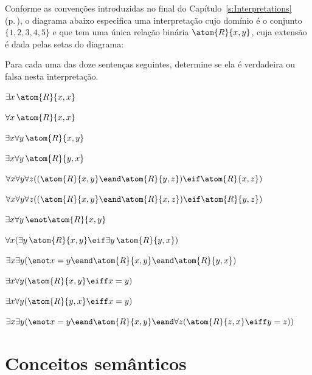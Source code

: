 \problempart
\label{pr.TorF3}
Conforme as convenções introduzidas no final do Capítulo~\ref{s:Interpretations} (p.\,\pageref{s:Interpret}), o diagrama abaixo especifica uma interpretação cujo domínio é o conjunto $\{1,2,3,4,5\}$ e que tem uma única relação binária $\atom{R}{x,y}$, cuja extensão é dada pelas setas do diagrama:
\begin{center}
\end{center}
Para cada uma das doze sentenças seguintes, determine se ela é verdadeira ou falsa nesta interpretação.
\begin{earg}
\item $\exists x\, \atom{R}{x,x}$
\item $\forall x\, \atom{R}{x,x}$
\item $\exists x \forall y\, \atom{R}{x,y}$
\item $\exists x \forall y\, \atom{R}{y,x}$
\item $\forall x \forall y \forall z ((\atom{R}{x,y} \eand \atom{R}{y,z}) \eif \atom{R}{x,z})$
\item $\forall x \forall y \forall z ((\atom{R}{x,y} \eand \atom{R}{x,z}) \eif \atom{R}{y,z})$
\item $\exists x \forall y\, \enot \atom{R}{x,y}$
\item $\forall x(\exists y\, \atom{R}{x,y} \eif \exists y\, \atom{R}{y,x})$
\item $\exists x \exists y (\enot x = y \eand \atom{R}{x,y} \eand \atom{R}{y,x})$
\item $\exists x \forall y(\atom{R}{x,y} \eiff x = y)$
\item $\exists x \forall y(\atom{R}{y,x} \eiff x = y)$
\item $\exists x \exists y(\enot x = y \eand \atom{R}{x,y} \eand \forall z(\atom{R}{z,x} \eiff y = z))$
\end{earg}


\chapter{Conceitos semânticos}


